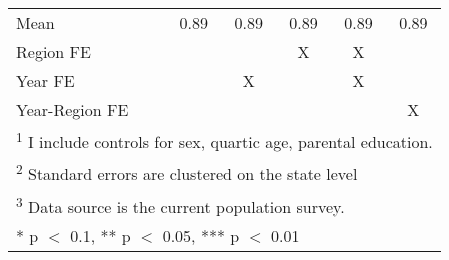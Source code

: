 \begin{table}[!h]
{\begin{tabular}[t]{lccccc}
Mean & \num{0.89} & \num{0.89} & \num{0.89} & \num{0.89} & \num{0.89}\\
Region FE &  &  & X & X & \\
Year FE &  & X &  & X & \\
Year-Region FE &  &  &  &  & X\\
\bottomrule
\multicolumn{6}{l}{\rule{0pt}{1em}\textsuperscript{1} I include controls for sex, quartic age, parental education.}\\
\multicolumn{6}{l}{\rule{0pt}{1em}\textsuperscript{2} Standard errors are clustered on the state level}\\
\multicolumn{6}{l}{\rule{0pt}{1em}\textsuperscript{3} Data source is the current population survey.}\\
\multicolumn{6}{l}{\rule{0pt}{1em}* p $<$ 0.1, ** p $<$ 0.05, *** p $<$ 0.01}\\
\end{tabular}}
\end{table}
